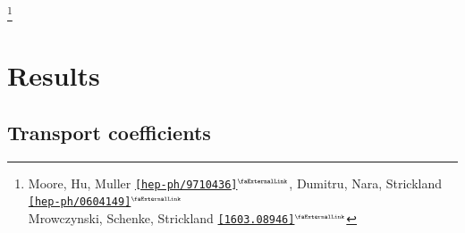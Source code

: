 \documentclass[aspectratio=169,11pt,usenames,dvipsnames]{beamer}
\renewcommand{\thefootnote}{\color{customblue}\faPaperPlaneO}
\newcommand\blfootnote[1]{%
  \begingroup
  \renewcommand\thefootnote{}\footnote{#1}%
  \addtocounter{footnote}{-1}%
  \endgroup
}
\begin{document}
\begin{frame}
    \blfootnote{\scriptsize Moore, Hu, Muller \href{https://arxiv.org/abs/hep-ph/9710436}{{\color{palgold}\texttt{[hep-ph/9710436]}$^\text{\tiny\faExternalLink}$}}, Dumitru, Nara, Strickland \href{https://arxiv.org/abs/hep-ph/0604149}{{\color{palgold}\texttt{[hep-ph/0604149]}$^\text{\tiny\faExternalLink}$}}\\
    \hspace{17pt}\scriptsize Mrowczynski, Schenke, Strickland \href{https://arxiv.org/abs/1603.08946}{{\color{palgold}\texttt{[1603.08946]}$^\text{\tiny\faExternalLink}$}}}
\end{frame}



\section{Results}






\subsection{Transport coefficients}

\end{document}
